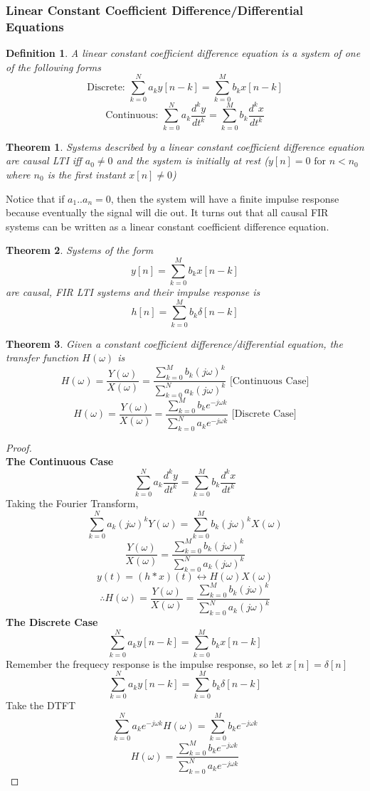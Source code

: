 \documentclass{article}
\newtheorem{theorem}{Theorem}
\newtheorem{definition}{Definition}
\newtheorem{proof}{Proof}
\begin{document}
\subsubsection{Linear Constant Coefficient Difference/Differential Equations}
\begin{definition}
    A linear constant coefficient difference equation is a system of one of the following forms
    $$\text{Discrete: } \sum_{k=0}^{N}{a_k y[n-k]} = \sum_{k=0}^{M}{b_k x[n-k]}$$
    $$\text{Continuous: } \sum_{k=0}^{N}{a_k\frac{d^ky}{dt^k}} = \sum_{k=0}^{M}{b_k\frac{d^kx}{dt^k}}$$
\end{definition}
\begin{theorem}
    Systems described by a linear constant coefficient difference equation are causal LTI iff $a_0 \ne 0$
    and the system is initially at rest ($y[n] = 0 \text{ for } n < n_0$ where $n_0$ is the first instant $x[n] \ne 0$)
\end{theorem}
Notice that if $a_1..a_n = 0$, then the system will have a finite impulse response because eventually the signal will die out.
It turns out that all causal FIR systems can be written as a linear constant coefficient difference equation.
\begin{theorem}
    Systems of the form
    $$y[n] = \sum_{k=0}^{M}{b_k x[n-k]}$$ are causal, FIR LTI systems and their impulse response is
    $$h[n] = \sum_{k=0}^{M}{b_k \delta[n-k]}$$
\end{theorem}
\begin{theorem}
    Given a constant coefficient difference/differential equation, the transfer function $H(\omega)$ is
    $$H(\omega) = \frac{Y(\omega)}{X(\omega)} = \frac{\sum_{k=0}^{M}{b_k(j\omega)^k}}{\sum_{k=0}^{N}{a_k(j\omega)^k}}\text{ [Continuous Case]}$$
    $$H(\omega) = \frac{Y(\omega)}{X(\omega)} = \frac{\sum_{k=0}^{M}{b_ke^{-j\omega k}}}{\sum_{k=0}^{N}{a_ke^{-j\omega k}}}\text{ [Discrete Case]}$$
\end{theorem}
\begin{proof}
    \textbf{\\The Continuous Case}
    $$\sum_{k=0}^{N}{a_k\frac{d^ky}{dt^k}} = \sum_{k=0}^{M}{b_k\frac{d^kx}{dt^k}}$$
    Taking the Fourier Transform,
    $$\sum_{k=0}^{N}{a_k(j\omega)^k Y(\omega)} = \sum_{k=0}^{M}{b_k(j\omega)^k X(\omega)}$$
    $$\frac{Y(\omega)}{X(\omega)} = \frac{\sum_{k=0}^{M}{b_k(j\omega)^k}}{\sum_{k=0}^{N}{a_k(j\omega)^k}}$$
    $$y(t) = (h*x)(t) \leftrightarrow H(\omega)X(\omega)$$
    $$\therefore H(\omega) = \frac{Y(\omega)}{X(\omega)} = \frac{\sum_{k=0}^{M}{b_k(j\omega)^k}}{\sum_{k=0}^{N}{a_k(j\omega)^k}}$$
    \textbf{The Discrete Case}
    $$\sum_{k=0}^{N}{a_k y[n-k]} = \sum_{k=0}^{M}{b_k x[n-k]}$$
    Remember the frequecy response is the impulse response, so let $x[n] = \delta[n]$
    $$\sum_{k=0}^{N}{a_k y[n-k]} = \sum_{k=0}^{M}{b_k \delta[n-k]}$$
    Take the DTFT
    $$\sum_{k=0}^{N}{a_k e^{-j\omega k}H(\omega)} = \sum_{k=0}^{M}{b_k e^{-j\omega k}}$$
    $$H(\omega) = \frac{\sum_{k=0}^{M}{b_k e^{-j\omega k}}}{\sum_{k=0}^{N}{a_k e^{-j\omega k}}}$$
\end{proof}
\end{document}
